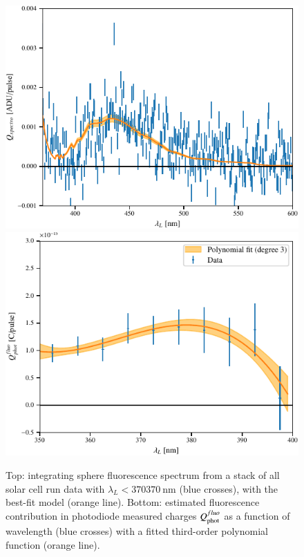 \begin{figure}[h]
    \centering
    \includegraphics[width=\columnwidth]{fig/spectro_stack_fluo_model.pdf}
    \includegraphics[width=\columnwidth]{fig/QPDfluo_model.pdf}
    \caption{Top: integrating sphere fluorescence spectrum from a stack of all solar cell run data with $\lambda_L < 370\SI{370}{\nano\meter}$ (blue crosses), with the best-fit model (orange line). Bottom: estimated fluorescence contribution in photodiode measured charges $Q_{\mathrm{phot}}^{fluo}$ as a function of wavelength (blue crosses) with a fitted third-order polynomial function (orange line).}
    \label{fig:fluo}
\end{figure}

